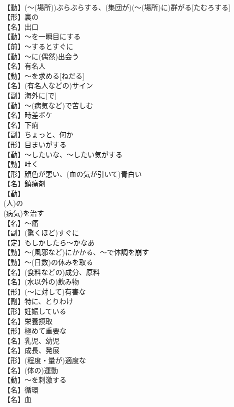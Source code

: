 \documentclass[8pt]{extreport}
\begin{document}
\begin{CJK}{UTF8}{min}
\\	【動】(～(場所))ぶらぶらする、(集団が)(～(場所)に)群がる[たむろする]
\\	【形】裏の
\\	【名】出口
\\	【動】～を一瞬目にする
\\	【前】～するとすぐに
\\	【動】～に(偶然)出会う
\\	【名】有名人
\\	【動】～を求める[ねだる]
\\	【名】(有名人などの)サイン
\\	【副】海外に[で]
\\	【動】～(病気など)で苦しむ
\\	【名】時差ボケ
\\	【名】下痢
\\	【副】ちょっと、何か
\\	【形】目まいがする
\\	【動】～したいな、～したい気がする
\\	【動】吐く
\\	【形】顔色が悪い、(血の気が引いて)青白い
\\	【名】鎮痛剤
\\	【動】
\\	(人)の
\\	(病気)を治す
\\	【名】～痛
\\	【副】(驚くほど)すぐに
\\	【定】もしかしたら～かなあ
\\	【動】～(風邪など)にかかる、～で体調を崩す
\\	【動】～(日数)の休みを取る
\\	【名】(食料などの)成分、原料
\\	【名】(水以外の)飲み物
\\	【形】(～に対して)有害な
\\	【副】特に、とりわけ
\\	【形】妊娠している
\\	【名】栄養摂取
\\	【形】極めて重要な
\\	【名】乳児、幼児
\\	【名】成長、発展
\\	【形】(程度・量が)適度な
\\	【名】(体の)運動
\\	【動】～を刺激する
\\	【名】循環
\\	【名】血

\end{CJK}
\end{document}
